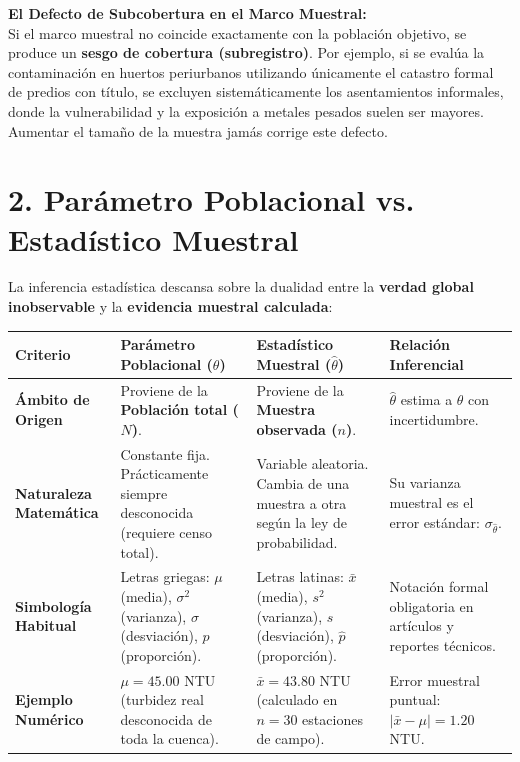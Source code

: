 \documentclass[11pt,a4paper]{article}
\begin{document}
\begin{alertbox}
\textbf{El Defecto de Subcobertura en el Marco Muestral:}\\
Si el marco muestral no coincide exactamente con la población objetivo, se produce un \textbf{sesgo de cobertura (subregistro)}. Por ejemplo, si se evalúa la contaminación en huertos periurbanos utilizando únicamente el catastro formal de predios con título, se excluyen sistemáticamente los asentamientos informales, donde la vulnerabilidad y la exposición a metales pesados suelen ser mayores. Aumentar el tamaño de la muestra jamás corrige este defecto.
\end{alertbox}

\vspace{0.2cm}

\section*{2. Parámetro Poblacional vs. Estadístico Muestral}

La inferencia estadística descansa sobre la dualidad entre la \textbf{verdad global inobservable} y la \textbf{evidencia muestral calculada}:

\begin{table}[h!]
\centering
\small
\begin{tabularx}{\linewidth}{p{3.5cm}p{4.2cm}p{4.2cm}Y}
\toprule
\textbf{Criterio} & \textbf{Parámetro Poblacional ($\theta$)} & \textbf{Estadístico Muestral ($\hat{\theta}$)} & \textbf{Relación Inferencial} \\
\midrule
\textbf{Ámbito de Origen} & Proviene de la \textbf{Población total ($N$)}. & Proviene de la \textbf{Muestra observada ($n$)}. & $\hat{\theta}$ estima a $\theta$ con incertidumbre. \\
\midrule
\textbf{Naturaleza Matemática} & Constante fija. Prácticamente siempre desconocida (requiere censo total). & Variable aleatoria. Cambia de una muestra a otra según la ley de probabilidad. & Su varianza muestral es el error estándar: $\sigma_{\hat{\theta}}$. \\
\midrule
\textbf{Simbología Habitual} & Letras griegas: $\mu$ (media), $\sigma^2$ (varianza), $\sigma$ (desviación), $p$ (proporción). & Letras latinas: $\bar{x}$ (media), $s^2$ (varianza), $s$ (desviación), $\hat{p}$ (proporción). & Notación formal obligatoria en artículos y reportes técnicos. \\
\midrule
\textbf{Ejemplo Numérico} & $\mu = 45.00$ NTU (turbidez real desconocida de toda la cuenca). & $\bar{x} = 43.80$ NTU (calculado en $n = 30$ estaciones de campo). & Error muestral puntual: $\vert \bar{x} - \mu \vert = 1.20$ NTU. \\
\bottomrule
\end{tabularx}
\end{table}
\end{document}

